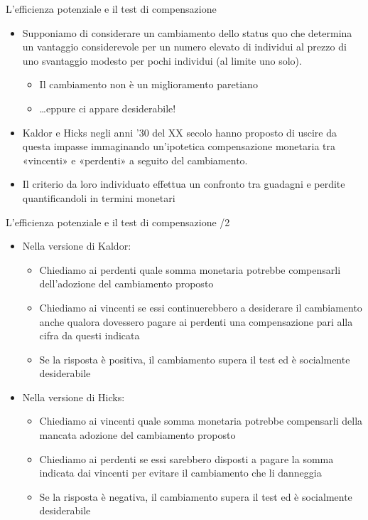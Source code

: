\documentclass[aspectratio=149,11pt]{beamer}
\begin{document}
\begin{frame}{L'efficienza potenziale e il test di compensazione}
\begin{itemize}
\item Supponiamo di considerare un cambiamento dello status quo che determina un vantaggio considerevole per un numero elevato di individui al prezzo di uno svantaggio modesto per pochi individui (al limite uno solo).
\begin{itemize}
\item Il cambiamento non è un miglioramento paretiano
\item \ldots{}eppure ci appare desiderabile!
\end{itemize}
\item Kaldor e Hicks negli anni '30 del XX secolo hanno proposto di uscire da questa impasse immaginando un’ipotetica compensazione monetaria tra «vincenti» e «perdenti» a seguito del cambiamento.
\item Il criterio da loro individuato effettua un confronto tra guadagni e perdite quantificandoli in termini monetari
\end{itemize}
\end{frame}


\begin{frame}{L'efficienza potenziale e il test di compensazione /2}
\begin{itemize}
\item Nella versione di Kaldor:
\begin{itemize}
\item Chiediamo ai perdenti quale somma monetaria potrebbe compensarli dell’adozione del cambiamento proposto
\item Chiediamo ai vincenti se essi continuerebbero a desiderare il cambiamento anche qualora dovessero pagare ai perdenti una compensazione pari alla cifra da questi indicata
\item Se la risposta è positiva, il cambiamento supera il test ed è socialmente desiderabile
\end{itemize}
\item Nella versione di Hicks:
\begin{itemize}
\item Chiediamo ai vincenti quale somma monetaria potrebbe compensarli della mancata adozione del cambiamento proposto
\item Chiediamo ai perdenti se essi sarebbero disposti a pagare la somma indicata dai vincenti per evitare il cambiamento che li danneggia
\item Se la risposta è negativa, il cambiamento supera il test ed è socialmente desiderabile
\end{itemize}
\end{itemize}
\end{frame}
\end{document}
